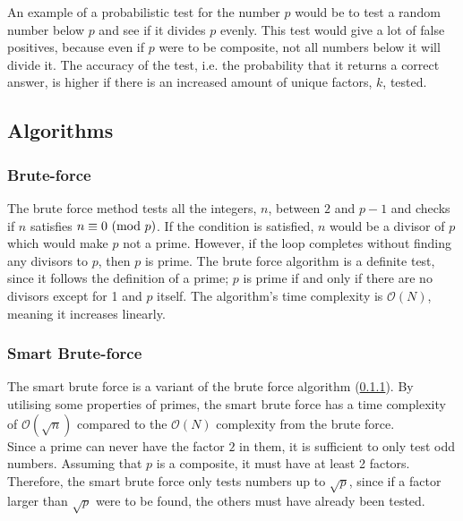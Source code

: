 \documentclass[main.tex]{subfiles}
\begin{document}
An example of a probabilistic test for the number $p$ would be to test a random
number below $p$ and see if it divides $p$ evenly. This test would give a lot of
false positives, because even if $p$ were to be composite, not all numbers below
it will divide it. The accuracy of the test, i.e. the probability that it
returns a correct answer, is higher if there is an increased amount of unique
factors, $k$, tested.

\subsection{Algorithms}

\subsubsection{Brute-force} \label{brute} The brute force method tests all the
integers, $n$, between $2$ and $p-1$ and checks if $n$ satisfies $n \equiv 0
\ (\mathrm{mod}\ p)$. If the condition is satisfied, $n$ would be a divisor of $p$ which
would make $p$ not a prime. However, if the loop completes without finding any
divisors to $p$, then $p$ is prime. The brute force algorithm is a definite
test, since it follows the definition of a prime; $p$ is prime if and only if
there are no divisors except for 1 and $p$ itself. The algorithm's time
complexity is $\mathcal{O}(N)$, meaning it increases linearly. \newline



\subsubsection{Smart Brute-force}
The smart brute force is a variant of the brute force algorithm (\ref{brute}).
By utilising some properties of primes, the smart brute force has a time
complexity of $\mathcal{O}(\sqrt{n})$ compared to the $\mathcal{O}(N)$
complexity from the brute force. \\

Since a prime can never have the factor $2$ in them, it is sufficient to only
test odd numbers. Assuming that $p$ is a composite, it must have at least 2
factors. Therefore, the smart brute force only tests numbers up to $\sqrt{p}$,
since if a factor larger than $\sqrt{p}$ were to be found, the others must have
already been tested. \newline


\end{document}
